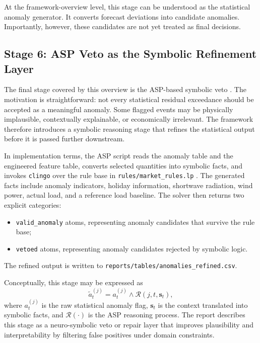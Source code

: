 At the framework-overview level, this stage can be understood as the statistical anomaly generator. It converts forecast deviations into candidate anomalies. Importantly, however, these candidates are not yet treated as final decisions.

\subsection{Stage 6: ASP Veto as the Symbolic Refinement Layer}

The final stage covered by this overview is the ASP-based symbolic veto \cite{gelfond1988stable,gebser2019multi}. The motivation is straightforward: not every statistical residual exceedance should be accepted as a meaningful anomaly. Some flagged events may be physically implausible, contextually explainable, or economically irrelevant. The framework therefore introduces a symbolic reasoning stage that refines the statistical output before it is passed further downstream.

In implementation terms, the ASP script reads the anomaly table and the engineered feature table, converts selected quantities into symbolic facts, and invokes \texttt{clingo} over the rule base in \texttt{rules/market\_rules.lp} \cite{repo_thesis_grid_anomaly}. The generated facts include anomaly indicators, holiday information, shortwave radiation, wind power, actual load, and a reference load baseline. The solver then returns two explicit categories:
\begin{itemize}
	\item \texttt{valid\_anomaly} atoms, representing anomaly candidates that survive the rule base;
	\item \texttt{vetoed} atoms, representing anomaly candidates rejected by symbolic logic.
\end{itemize}
The refined output is written to \texttt{reports/tables/anomalies\_refined.csv}.

Conceptually, this stage may be expressed as
\begin{equation}
	\tilde{a}_t^{(j)} = a_t^{(j)} \wedge \mathcal{R}\!\left(j,t,\mathbf{s}_t\right),
	\label{eq:framework_asp}
\end{equation}
where $a_t^{(j)}$ is the raw statistical anomaly flag, $\mathbf{s}_t$ is the context translated into symbolic facts, and $\mathcal{R}(\cdot)$ is the ASP reasoning process. The report describes this stage as a neuro-symbolic veto or repair layer that improves plausibility and interpretability by filtering false positives under domain constraints.

